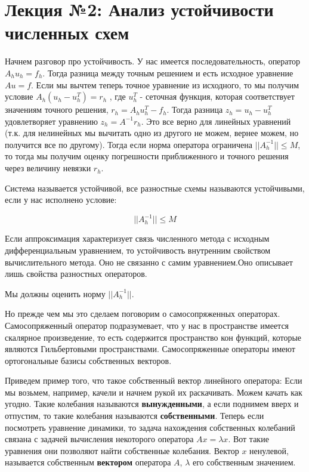 \section*{Лекция №2: Анализ устойчивости численных схем}

Начнем разговор про устойчивость. У нас имеется последовательность, оператор $A_h u_h = f_h$. Тогда разница между точным решением и есть исходное уравнение $Au = f$. Если мы вычтем теперь точное уравнение из исходного, то мы получим условие $A_h (u_h - u_h^T) = r_h$ , где $u_h^T$ - сеточная функция, которая соответствует значениям точного решения, $r_h = A_h u_h^T - f_h$. Тогда разница $z_h = u_h - u_h^T$ удовлетворяет уравнению $z_h = A^{-1} r_h$. Это все верно для линейных уравнений (т.к. для нелинейных мы вычитать одно из другого не можем, вернее можем, но получится все по другому). Тогда если норма оператора ограничена $||A^{-1}_h|| \leq M$, то тогда мы получим оценку погрешности приближенного и точного решения через величину невязки $r_h$.

\begin{definition}
	Система называется устойчивой, все разностные схемы называются устойчивыми, если у нас исполнено условие:
	
	\begin{equation}
		\label{eq:cond-stable}
		||A^{-1}_h|| \leq M
	\end{equation}	

\end{definition}

\begin{mdframed}
	Если аппроксимация характеризует связь численного метода с исходным дифференциальным уравнением, то устойчивость внутренним свойством вычислительного метода. Оно не связанно с самим уравнением.Оно описывает лишь свойства разностных операторов.
\end{mdframed}

Мы должны оценить норму $||A^{-1}_h||$.

Но прежде чем мы это сделаем поговорим о самосопряженных операторах. Самосопряженный оператор подразумевает, что у нас в пространстве имеется скалярное произведение, то есть содержится пространство кон функций, которые являются Гильбертовыми пространствами. Самосопряженные операторы имеют ортогональные базисы собственных векторов.


\begin{mdframed}
	Приведем пример того, что такое собственный вектор линейного оператора: Если мы возьмем, например, качели и начнем рукой их раскачивать. Можем качать как угодно. Такие колебания называются \textbf{вынужденными}, а если поднимем вверх и отпустим, то такие колебания называются \textbf{собственными}. Теперь если посмотреть уравнение динамики, то задача нахождения собственных колебаний связана с задачей вычисления некоторого оператора $Ax = \lambda x$. Вот такие уравнения они позволяют найти собственные колебания. Вектор $x$ ненулевой, называется собственным \textbf{вектором} оператора $A$, $\lambda$ его собственным значением.
\end{mdframed}

